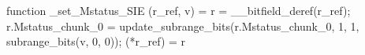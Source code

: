 function _set_Mstatus_SIE (r_ref, v) = {
    r = __bitfield_deref(r_ref);
    r.Mstatus_chunk_0 = update_subrange_bits(r.Mstatus_chunk_0, 1, 1, subrange_bits(v, 0, 0));
    (*r_ref) = r
}
